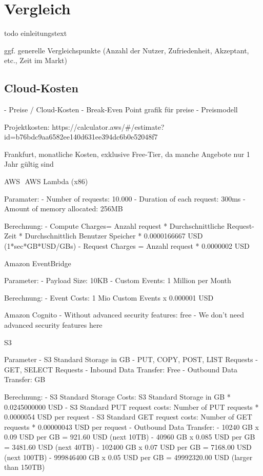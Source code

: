 \chapter{Vergleich}

todo einleitungstext

ggf. generelle Vergleichspunkte (Anzahl der Nutzer, Zufriedenheit, Akzeptant, etc., Zeit im Markt)

\section{Cloud-Kosten}

- Preise / Cloud-Kosten
  - Break-Even Point grafik für preise
  - Preismodell



  Projektkosten:
  https://calculator.aws/#/estimate?id=b76bdc9aa6582ee140d631ee394dc6b0e52048f7

  Frankfurt, monatliche Kosten, exklusive Free-Tier, da manche Angebote nur 1 Jahr gültig sind

  AWS
 AWS Lambda (x86)

  Paramater:
  - Number of requests: 10.000
  - Duration of each request: 300ms
  - Amount of memory allocated: 256MB

  Berechnung:
  - Compute Charges= Anzahl request * Durchschnittliche Request-Zeit * Durchschnittlich Benutzer Speicher * 0.0000166667 USD (1*sec*GB*USD/GBs)
  - Request Charges = Anzahl request * 0.0000002 USD

  Amazon EventBridge

  Parameter:
  - Payload Size: 10KB
  - Custom Events: 1 Million per Month

  Berechnung:
  - Event Costs: 1 Mio Custom Events x 0.000001 USD

  Amazon Cognito
  - Without advanced security features: free
  - We don’t need advanced security features here

  S3

  Parameter
  - S3 Standard Storage in GB
  - PUT, COPY, POST, LIST Requests
  - GET, SELECT Requests
  - Inbound Data Transfer: Free
  - Outbound Data Transfer: GB

  Berechnung:
  - S3 Standard Storage Costs: S3 Standard Storage in GB * 0.0245000000 USD
  - S3 Standard PUT request costs: Number of PUT requests * 0.0000054 USD per request
  - S3 Standard GET request costs: Number of GET requests * 0.00000043 USD per request
  - Outbound Data Transfer:
      - 10240 GB x 0.09 USD per GB = 921.60 USD (next 10TB)
      - 40960 GB x 0.085 USD per GB = 3481.60 USD (next 40TB)
      - 102400 GB x 0.07 USD per GB = 7168.00 USD (next 100TB)
      - 999846400 GB x 0.05 USD per GB = 49992320.00 USD (larger than 150TB)

